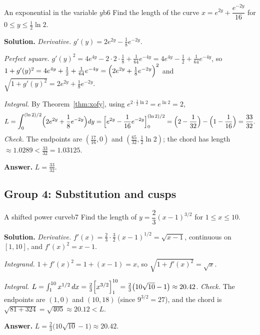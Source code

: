 \documentclass[11pt]{article}
\begin{document}
\begin{exmp}{An exponential in the variable $y$}{b6}
Find the length of the curve $x=e^{2y}+\dfrac{e^{-2y}}{16}$ for $0\le y\le\frac12\ln2$.

\textbf{Solution.} \emph{Derivative.} $g'(y)=2e^{2y}-\frac18e^{-2y}$.

\emph{Perfect square.} $g'(y)^2=4e^{4y}-2\cdot2\cdot\frac18+\frac1{64}e^{-4y}=4e^{4y}-\frac12+\frac1{64}e^{-4y}$, so $1+g'(y)^2=4e^{4y}+\frac12+\frac1{64}e^{-4y}=\Bigl(2e^{2y}+\frac18e^{-2y}\Bigr)^2$ and $\sqrt{1+g'(y)^2}=2e^{2y}+\frac18e^{-2y}$.

\emph{Integral.} By Theorem~\ref{thm:xofy}, using $e^{2\cdot\frac12\ln2}=e^{\ln2}=2$,
\[
L=\int_0^{(\ln2)/2}\Bigl(2e^{2y}+\frac18e^{-2y}\Bigr)dy=\Bigl[e^{2y}-\frac1{16}e^{-2y}\Bigr]_0^{(\ln2)/2}=\Bigl(2-\frac1{32}\Bigr)-\Bigl(1-\frac1{16}\Bigr)=\frac{33}{32} .
\]
\emph{Check.} The endpoints are $(\frac{17}{16},0)$ and $(\frac{65}{32},\frac12\ln2)$; the chord has length $\approx1.0289<\frac{33}{32}=1.03125$.

\textbf{Answer.} $L=\frac{33}{32}$.
\end{exmp}

\subsection*{Group 4: Substitution and cusps}

\begin{exmp}{A shifted power curve}{b7}
Find the length of $y=\dfrac23(x-1)^{3/2}$ for $1\le x\le10$.

\textbf{Solution.} \emph{Derivative.} $f'(x)=\frac23\cdot\frac32(x-1)^{1/2}=\sqrt{x-1}$, continuous on $[1,10]$, and $f'(x)^2=x-1$.

\emph{Integrand.} $1+f'(x)^2=1+(x-1)=x$, so $\sqrt{1+f'(x)^2}=\sqrt x$.

\emph{Integral.} $L=\int_1^{10}x^{1/2}\,dx=\frac23\Bigl[x^{3/2}\Bigr]_1^{10}=\frac23\bigl(10\sqrt{10}-1\bigr)\approx20.42$.
\emph{Check.} The endpoints are $(1,0)$ and $(10,18)$ (since $9^{3/2}=27$), and the chord is $\sqrt{81+324}=\sqrt{405}\approx20.12<L$.

\textbf{Answer.} $L=\frac23\bigl(10\sqrt{10}-1\bigr)\approx20.42$.
\end{exmp}
\end{document}
